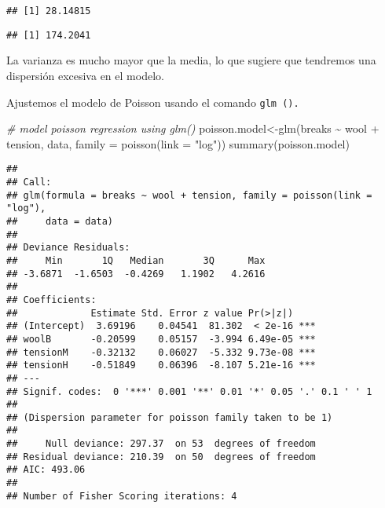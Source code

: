 \documentclass[
]{book}
\newenvironment{Shaded}{\begin{snugshade}}{\end{snugshade}}
\newcommand{\AttributeTok}[1]{\textcolor[rgb]{0.77,0.63,0.00}{#1}}
\newcommand{\CommentTok}[1]{\textcolor[rgb]{0.56,0.35,0.01}{\textit{#1}}}
\newcommand{\FunctionTok}[1]{\textcolor[rgb]{0.00,0.00,0.00}{#1}}
\newcommand{\NormalTok}[1]{#1}
\newcommand{\OtherTok}[1]{\textcolor[rgb]{0.56,0.35,0.01}{#1}}
\newcommand{\SpecialCharTok}[1]{\textcolor[rgb]{0.00,0.00,0.00}{#1}}
\newcommand{\StringTok}[1]{\textcolor[rgb]{0.31,0.60,0.02}{#1}}
\begin{document}
\begin{verbatim}
## [1] 28.14815
\end{verbatim}

\begin{Shaded}
\end{Shaded}

\begin{verbatim}
## [1] 174.2041
\end{verbatim}

La varianza es mucho mayor que la media, lo que sugiere que tendremos una dispersión excesiva en el modelo.

Ajustemos el modelo de Poisson usando el comando \texttt{glm\ ().}

\begin{Shaded}
\begin{Highlighting}[]
\CommentTok{\# model poisson regression using glm()}
\NormalTok{poisson.model}\OtherTok{\textless{}{-}}\FunctionTok{glm}\NormalTok{(breaks }\SpecialCharTok{\textasciitilde{}}\NormalTok{ wool }\SpecialCharTok{+}\NormalTok{ tension, data, }\AttributeTok{family =} \FunctionTok{poisson}\NormalTok{(}\AttributeTok{link =} \StringTok{"log"}\NormalTok{))}
\FunctionTok{summary}\NormalTok{(poisson.model)}
\end{Highlighting}
\end{Shaded}

\begin{verbatim}
## 
## Call:
## glm(formula = breaks ~ wool + tension, family = poisson(link = "log"), 
##     data = data)
## 
## Deviance Residuals: 
##     Min       1Q   Median       3Q      Max  
## -3.6871  -1.6503  -0.4269   1.1902   4.2616  
## 
## Coefficients:
##             Estimate Std. Error z value Pr(>|z|)    
## (Intercept)  3.69196    0.04541  81.302  < 2e-16 ***
## woolB       -0.20599    0.05157  -3.994 6.49e-05 ***
## tensionM    -0.32132    0.06027  -5.332 9.73e-08 ***
## tensionH    -0.51849    0.06396  -8.107 5.21e-16 ***
## ---
## Signif. codes:  0 '***' 0.001 '**' 0.01 '*' 0.05 '.' 0.1 ' ' 1
## 
## (Dispersion parameter for poisson family taken to be 1)
## 
##     Null deviance: 297.37  on 53  degrees of freedom
## Residual deviance: 210.39  on 50  degrees of freedom
## AIC: 493.06
## 
## Number of Fisher Scoring iterations: 4
\end{verbatim}
\end{document}
